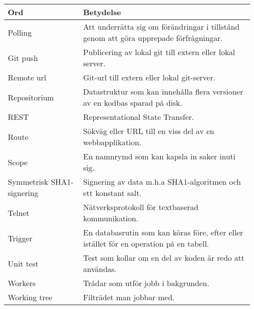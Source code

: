 \begin{tabular} { | l | p{10cm} | }
\hline
\bf{Ord} & \bf{Betydelse} \\
\hline
Polling & Att underrätta sig om förändringar i tillstånd genom att göra upprepade förfrågningar. \\
\hline
Git push & Publicering av lokal git till extern eller lokal server. \\
\hline
Remote url & Git-url till extern eller lokal git-server. \\
\hline
Repositorium & Datastruktur som kan innehålla flera versioner av en kodbas sparad på disk. \\
\hline
REST & Representational State Transfer. \\
\hline
Route & Sökväg eller URL till en viss del av en webbapplikation. \\
\hline
Scope & En namnrymd som kan kapsla in saker inuti sig. \\
\hline
Symmetrisk SHA1-signering & Signering av data m.h.a SHA1-algoritmen och ett konstant salt. \\
\hline
Telnet & Nätverksprotokoll för textbaserad kommunikation. \\
\hline
Trigger & En databasrutin som kan köras före, efter eller istället för en operation på en tabell. \\
\hline
Unit test & Test som kollar om en del av koden är redo att användas. \\
\hline
Workers & Trådar som utför jobb i bakgrunden. \\
\hline
Working tree & Filträdet man jobbar med. \\
\hline
\end{tabular}
\normalsize

